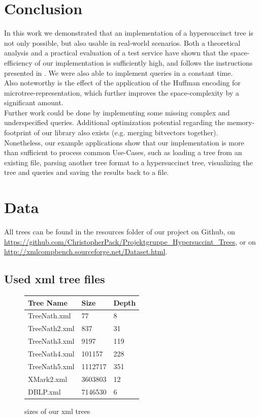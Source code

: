 \documentclass{article}
\begin{document}
\section{Conclusion}
In this work we demonstrated that an implementation of a hypersuccinct tree is not only possible, but also usable in real-world scenarios. Both a theoretical analysis and a practical evaluation of a test service have shown that the space-efficiency of our implementation is sufficiently high, and follows the instructions presented in \cite{farzanMunro}. We were also able to implement queries in a constant time.\\
Also noteworthy is the effect of the application of the Huffman encoding for microtree-representation, which further improves the space-complexity by a significant amount.\\
Further work could be done by implementing some missing complex and underspecified queries. Additional optimization potential regarding the memory-footprint of our library also exists (e.g. merging bitvectors together).\\
Nonetheless, our example applications show that our implementation is more than sufficient to process common Use-Cases, such as loading a tree from an existing file, parsing another tree format to a hypersuccinct tree, visualizing the tree and queries and saving the results back to a file.

\section{Data}
All trees can be found in the resources folder of our project on Github, on \href{https://github.com/ChristopherPack/Projektgruppe\_Hypersuccint\_Trees}{https://github.com/ChristopherPack/Projektgruppe\_Hypersuccint\_Trees}, or on \href{http://xmlcompbench.sourceforge.net/Dataset.html}{http://xmlcompbench.sourceforge.net/Dataset.html}.
\subsection{Used xml tree files}
\begin{figure}[H]
	\begin{tabular}{ |p{3cm}||p{}||p{}| }
		 \hline
		 Tree Name & Size & Depth\\
		 \hline
		 TreeNath.xml   &77 & 8\\
		 TreeNath2.xml&  837 & 31\\
		 TreeNath3.xml&9197 & 119\\
		 TreeNath4.xml&101157 & 228\\
		 TreeNath5.xml&1112717 & 351\\
		 XMark2.xml&3603803 & 12\\
		 DBLP.xml&7146530 & 6\\
		 \hline
	\end{tabular}
\caption{sizes of our xml trees}
\label{data:table1}
\end{figure}



\end{document}

